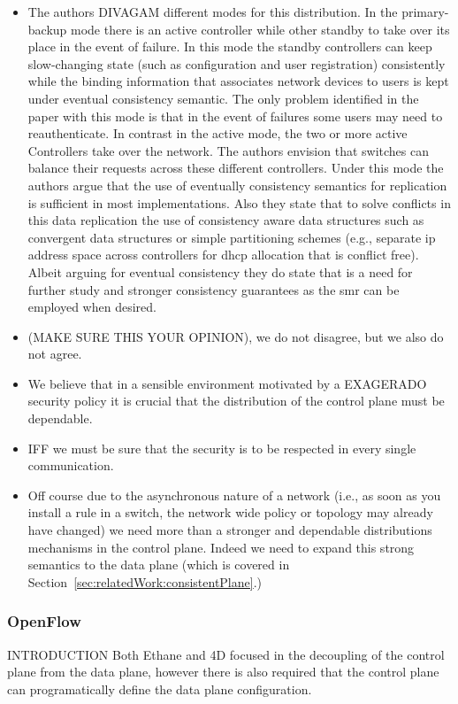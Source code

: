 \begin{itemize}
\begin{itemize}
\item The authors  DIVAGAM different modes for this distribution. In the primary-backup mode there is an active controller while other standby to take over its place in the event of failure. 
In this mode the standby controllers can keep slow-changing state (such as configuration and user registration) consistently while the binding information that associates network devices to users is kept under eventual consistency semantic. The only problem identified in the paper with this mode is that in the event of failures some users may need to reauthenticate. 
In contrast in the active mode, the two or more active Controllers take over the network. The authors envision that switches can balance their requests across these different controllers. Under this mode the authors argue that  the use of eventually consistency semantics for replication is sufficient in most implementations. Also they state that to solve conflicts in this data replication the use of consistency aware data structures such as convergent data structures or simple partitioning schemes (e.g., separate \gls{ip} address space across controllers for \gls{dhcp} allocation that is conflict free). Albeit arguing for eventual consistency they do state that is a need for further study and stronger consistency guarantees as the \gls{smr} can be employed when desired. 

\item (MAKE SURE THIS YOUR OPINION), we do not disagree, but we also do not agree. 
\item We believe that in a sensible environment motivated by a EXAGERADO security policy it is crucial that the distribution of the control plane must be dependable. 
\item IFF we must be sure that the security is to be respected in every single communication. 
\item Off course due to the asynchronous nature of a network (i.e., as soon as you install a rule in a switch, the network wide policy or topology may already have changed)  we need more than a stronger and dependable distributions mechanisms in the control plane. Indeed we need to expand this strong semantics to the data plane (which is covered in Section~\ref{sec:relatedWork:consistentPlane}.) 

\end{itemize}



\subsubsection{OpenFlow}
INTRODUCTION 
Both Ethane \cite{Casado:2007kb} and 4D \cite{Greenberg:2005boa}
focused in the decoupling of the control plane from the data plane, however there is also required that the control plane can programatically define the data plane configuration. 


\end{itemize}
